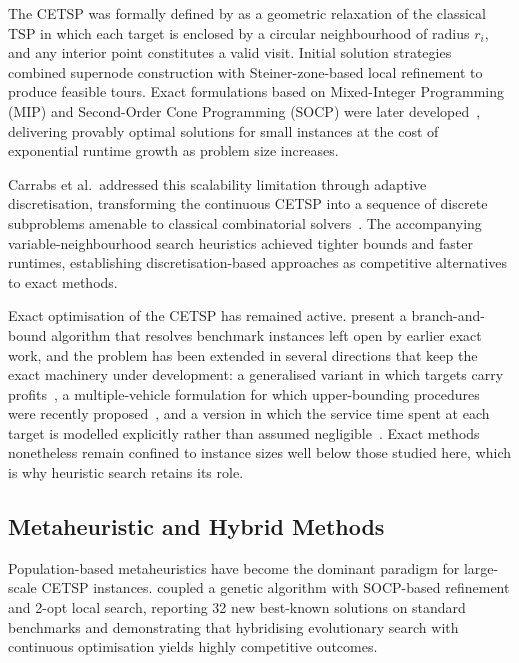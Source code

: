 \documentclass[a4paper,fleqn]{cas-dc}
\begin{document}
The CETSP was formally defined by \citet{gulczynski2006close} as a geometric
relaxation of the classical TSP in which each target is enclosed by a circular
neighbourhood of radius $r_i$, and any interior point constitutes a valid visit.
Initial solution strategies combined supernode construction with
Steiner-zone-based local refinement to produce feasible tours. Exact
formulations based on Mixed-Integer Programming (MIP) and Second-Order Cone
Programming (SOCP) were later
developed~\citep{behdani2014integer,coutinho2016branch}, delivering provably
optimal solutions for small instances at the cost of exponential runtime growth
as problem size increases.

Carrabs et al.\ addressed this scalability limitation through adaptive
discretisation, transforming the continuous CETSP into a sequence of discrete
subproblems amenable to classical combinatorial
solvers~\citep{CARRABS2017163,carrabs2020adaptive}. The accompanying
variable-neighbourhood search heuristics achieved tighter bounds and faster
runtimes, establishing discretisation-based approaches as competitive
alternatives to exact methods.

Exact optimisation of the CETSP has remained active.
\citet{zhang2023cetspbb} present a branch-and-bound algorithm that resolves
benchmark instances left open by earlier exact work, and the problem has been
extended in several directions that keep the exact machinery under development:
a generalised variant in which targets carry
profits~\citep{diplacido2023generalized}, a multiple-vehicle formulation for
which upper-bounding procedures were recently
proposed~\citep{carrabs2025upper}, and a version in which the service time spent
at each target is modelled explicitly rather than assumed
negligible~\citep{cui2026service}. Exact methods nonetheless remain confined to
instance sizes well below those studied here, which is why heuristic search
retains its role.

\subsection{Metaheuristic and Hybrid Methods}\label{sec:rel-meta}

Population-based metaheuristics have become the dominant paradigm for
large-scale CETSP instances. \citet{DIPLACIDO2022105831} coupled a genetic
algorithm with SOCP-based refinement and 2-opt local search, reporting 32 new
best-known solutions on standard benchmarks and demonstrating that hybridising
evolutionary search with continuous optimisation yields highly competitive
outcomes.
\end{document}
